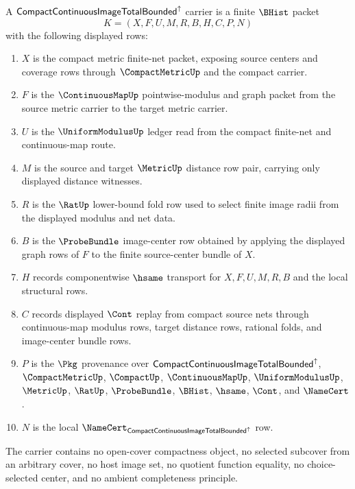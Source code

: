 \begin{definition}
\label{def:compact-continuous-image-total-bounded-carrier}
A $\mathsf{CompactContinuousImageTotalBounded}^{\uparrow}$ carrier is a finite $\BHist$ packet
$$
K=(X,F,U,M,R,B,H,C,P,N)
$$
with the following displayed rows:
\begin{enumerate}
\item $X$ is the compact metric finite-net packet, exposing source centers and coverage rows through $\CompactMetricUp$ and the compact carrier.
\item $F$ is the $\ContinuousMapUp$ pointwise-modulus and graph packet from the source metric carrier to the target metric carrier.
\item $U$ is the $\UniformModulusUp$ ledger read from the compact finite-net and continuous-map route.
\item $M$ is the source and target $\MetricUp$ distance row pair, carrying only displayed distance witnesses.
\item $R$ is the $\RatUp$ lower-bound fold row used to select finite image radii from the displayed modulus and net data.
\item $B$ is the $\ProbeBundle$ image-center row obtained by applying the displayed graph rows of $F$ to the finite source-center bundle of $X$.
\item $H$ records componentwise $\hsame$ transport for $X,F,U,M,R,B$ and the local structural rows.
\item $C$ records displayed $\Cont$ replay from compact source nets through continuous-map modulus rows, target distance rows, rational folds, and image-center bundle rows.
\item $P$ is the $\Pkg$ provenance over $\mathsf{CompactContinuousImageTotalBounded}^{\uparrow}$, $\CompactMetricUp$, $\CompactUp$, $\ContinuousMapUp$, $\UniformModulusUp$, $\MetricUp$, $\RatUp$, $\ProbeBundle$, $\BHist$, $\hsame$, $\Cont$, and $\NameCert$.
\item $N$ is the local $\NameCert_{\CompactContinuousImageTotalBoundedUp}$ row.
\end{enumerate}
The carrier contains no open-cover compactness object, no selected subcover from an arbitrary cover, no host image set, no quotient function equality, no choice-selected center, and no ambient completeness principle.
\end{definition}

